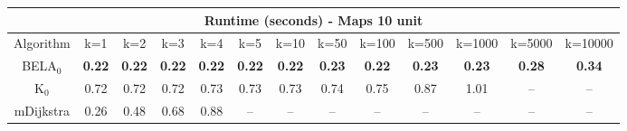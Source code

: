 \begin{tabular}{c|cccccccccccc}\toprule
\multicolumn{13}{c}{Runtime (seconds) - Maps 10 unit}\\ \midrule
Algorithm & k=1 & k=2 & k=3 & k=4 & k=5 & k=10 & k=50 & k=100 & k=500 & k=1000 & k=5000 & k=10000 \\ \midrule
BELA$_0$ & \textbf{0.22} & \textbf{0.22} & \textbf{0.22} & \textbf{0.22} & \textbf{0.22} & \textbf{0.22} & \textbf{0.23} & \textbf{0.22} & \textbf{0.23} & \textbf{0.23} & \textbf{0.28} & \textbf{0.34} \\
K$_0$ & 0.72 & 0.72 & 0.72 & 0.73 & 0.73 & 0.73 & 0.74 & 0.75 & 0.87 & 1.01 & -- & -- \\
mDijkstra & 0.26 & 0.48 & 0.68 & 0.88 & -- & -- & -- & -- & -- & -- & -- & -- \\ \bottomrule 
\end{tabular}
